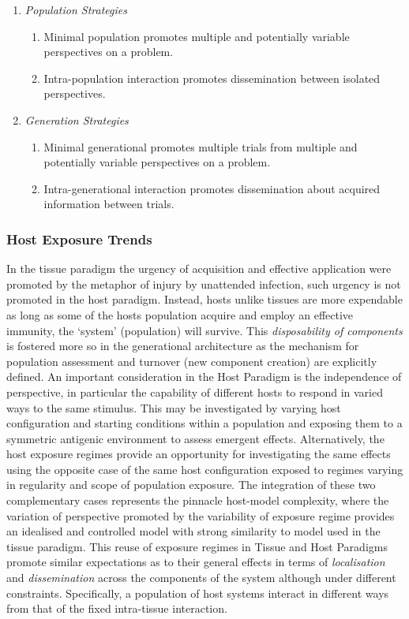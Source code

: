 \begin{enumerate}
	\item \emph{Population Strategies}
	\begin{enumerate}
		\item Minimal population promotes multiple and potentially variable perspectives on a problem.
		\item Intra-population interaction promotes dissemination between isolated perspectives.
	\end{enumerate}	
	\item \emph{Generation Strategies}
	\begin{enumerate}
		\item Minimal generational promotes multiple trials from multiple and potentially variable perspectives on a problem.
		\item Intra-generational interaction promotes dissemination about acquired information between trials.
	\end{enumerate}	
\end{enumerate}

%
%
\subsubsection{Host Exposure Trends}
In the tissue paradigm the urgency of acquisition and effective application were promoted by the metaphor of injury by unattended infection, such urgency is not promoted in the host paradigm. Instead, hosts unlike tissues are more expendable as long as some of the hosts population acquire and employ an effective immunity, the `system' (population) will survive. This \emph{disposability of components} is fostered more so in the generational architecture as the mechanism for population assessment and turnover (new component creation) are explicitly defined. 
An important consideration in the Host Paradigm is the independence of perspective, in particular the capability of different hosts to respond in varied ways to the same stimulus. This may be investigated by varying host configuration and starting conditions within a population and exposing them to a symmetric antigenic environment to assess emergent effects. 
Alternatively, the host exposure regimes provide an opportunity for investigating the same effects using the opposite case of the same host configuration exposed to regimes varying in regularity and scope of population exposure. The integration of these two complementary cases represents the pinnacle host-model complexity, where the variation of perspective promoted by the variability of exposure regime provides an idealised and controlled model with strong similarity to model used in the tissue paradigm.
This reuse of exposure regimes in Tissue and Host Paradigms promote similar expectations as to their general effects in terms of \emph{localisation} and \emph{dissemination} across the components of the system although under different constraints. Specifically, a population of host systems interact in different ways from that of the fixed intra-tissue interaction.

